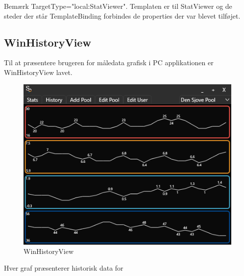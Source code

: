 Bemærk TargetType="local:StatViewer". Templaten er til StatViewer og de steder der står TemplateBinding forbindes de properties der var blevet tilføjet.

\subsection{WinHistoryView}
Til at præsentere brugeren for måledata grafisk i PC applikationen er WinHistoryView lavet.
\begin{figure}
\centering
\includegraphics[width=0.6\linewidth]{figs/implementering/winhistoryview}
\caption{WinHistoryView}
\label{fig:winhistoryview}
\end{figure}
Hver graf præsenterer historisk data for 